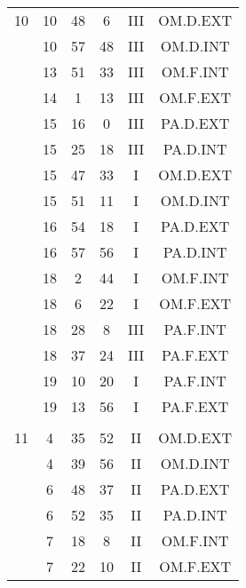 \documentclass[12pt, a4paper]{article}
\begin{document}
\begin{multicols}{3}
{\begin{tabular}{c c c c c c}
	 	 	 	10 & 10 & 48 & 6 & III & OM.D.EXT\\%
	 	 	 	 & 10 & 57 & 48 & III & OM.D.INT\\%
	 	 	 	 & 13 & 51 & 33 & III & OM.F.INT\\%
	 	 	 	 & 14 & 1 & 13 & III & OM.F.EXT\\%
	 	 	 	 & 15 & 16 & 0 & III & PA.D.EXT\\%
	 	 	 	 & 15 & 25 & 18 & III & PA.D.INT\\%
	 	 	 	 & 15 & 47 & 33 & I & OM.D.EXT\\%
	 	 	 	 & 15 & 51 & 11 & I & OM.D.INT\\%
	 	 	 	 & 16 & 54 & 18 & I & PA.D.EXT\\%
	 	 	 	 & 16 & 57 & 56 & I & PA.D.INT\\%
	 	 	 	 & 18 & 2 & 44 & I & OM.F.INT\\%
	 	 	 	 & 18 & 6 & 22 & I & OM.F.EXT\\%
	 	 	 	 & 18 & 28 & 8 & III & PA.F.INT\\%
	 	 	 	 & 18 & 37 & 24 & III & PA.F.EXT\\%
	 	 	 	 & 19 & 10 & 20 & I & PA.F.INT\\%
	 	 	 	 & 19 & 13 & 56 & I & PA.F.EXT\\%
	 	 	 	 & & & & & \\%
	 	 	 	11 & 4 & 35 & 52 & II & OM.D.EXT\\%
	 	 	 	 & 4 & 39 & 56 & II & OM.D.INT\\%
	 	 	 	 & 6 & 48 & 37 & II & PA.D.EXT\\%
	 	 	 	 & 6 & 52 & 35 & II & PA.D.INT\\%
	 	 	 	 & 7 & 18 & 8 & II & OM.F.INT\\%
	 	 	 	 & 7 & 22 & 10 & II & OM.F.EXT\\%

\end{tabular}}
\end{multicols}
\end{document}
